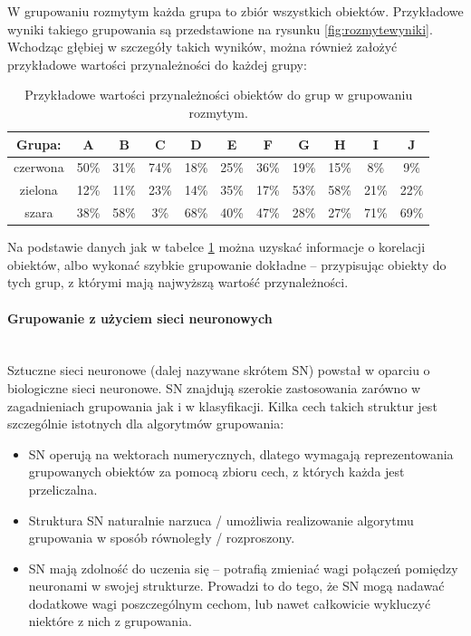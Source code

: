 \documentclass{article}
\newcommand{\myparagraph}[1]{\paragraph{#1}\mbox{}\\}
\begin{document}
W grupowaniu rozmytym każda grupa to zbiór wszystkich obiektów. Przykładowe wyniki takiego grupowania są przedstawione na rysunku \ref{fig:rozmytewyniki}. Wchodząc głębiej w szczegóły takich wyników, można również założyć przykładowe wartości przynależności do każdej grupy:

\begin{table}[H]
	\centering
	\begin{tabular}{c|c|c|c|c|c|c|c|c|c|c}
		Grupa: & A & B & C & D & E & F & G & H & I & J \\ \hline
		czerwona & 50\% & 31\% & 74\% & 18\% & 25\% & 36\% & 19\% & 15\% & 8\% & 9\% \\ \hline
		zielona & 12\% & 11\% & 23\% & 14\% & 35\% & 17\% & 53\% & 58\% & 21\% & 22\% \\ \hline
		szara & 38\% & 58\% & 3\% & 68\% & 40\% & 47\% & 28\% & 27\% & 71\% & 69\%
	\end{tabular}
	\caption{Przykładowe wartości przynależności obiektów do grup w grupowaniu rozmytym.}
	\label{tab:rozmytewyniki}
\end{table}

Na podstawie danych jak w tabelce \ref{tab:rozmytewyniki} można uzyskać informacje o korelacji obiektów, albo wykonać szybkie grupowanie dokładne – przypisując obiekty do tych grup, z którymi mają najwyższą wartość przynależności.

\myparagraph{Grupowanie z użyciem sieci neuronowych}

Sztuczne sieci neuronowe (dalej nazywane skrótem SN) powstał w oparciu o biologiczne sieci neuronowe. SN znajdują szerokie zastosowania zarówno w zagadnieniach grupowania jak i w klasyfikacji. Kilka cech takich struktur jest szczególnie istotnych dla algorytmów grupowania:

\begin{itemize}
	\item SN operują na wektorach numerycznych, dlatego wymagają reprezentowania grupowanych obiektów za pomocą zbioru cech, z których każda jest przeliczalna.
	\item Struktura SN naturalnie narzuca / umożliwia realizowanie algorytmu grupowania w sposób równoległy / rozproszony.
	\item SN mają zdolność do uczenia się – potrafią zmieniać wagi połączeń pomiędzy neuronami w swojej strukturze. Prowadzi to do tego, że SN mogą nadawać dodatkowe wagi poszczególnym cechom, lub nawet całkowicie wykluczyć niektóre z nich z grupowania.
\end{itemize}
\end{document}
